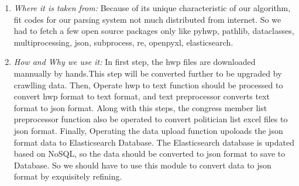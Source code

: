 \documentclass[conference]{IEEEtran}
\begin{document}
\begin{enumerate}
\begin{enumerate}
\end{enumerate}

 
   \item \textit{Where it is taken from: } Because of its unique characteristic of our algorithm, fit codes for our parsing system not much distributed from internet. So we had to fetch a few open source packages only like pyhwp, pathlib, dataclasses, multiprocessing, json, subprocess, re, openpyxl, elasticsearch.\\
   
  \item \textit{How and Why we use it: } In first step, the hwp files are downloaded mannually by hands.This step will be converted further to be upgraded by crawlling data. Then, Operate hwp to text function should be processed to convert hwp format to text format, and text preprocessor converts text format to json format. Along with this steps, the congress member list preprocessor function also be operated to convert politician list excel files to json format. Finally, Operating the data upload function upoloads the json format data to Elasticsearch Database. The Elasticsearch database is updated based on NoSQL, so the data should be converted to json format to save to Database. So we should have to use this module to convert data to json format by exquisitely refining.\\
  \end{enumerate}
 
 
 
\end{document}
